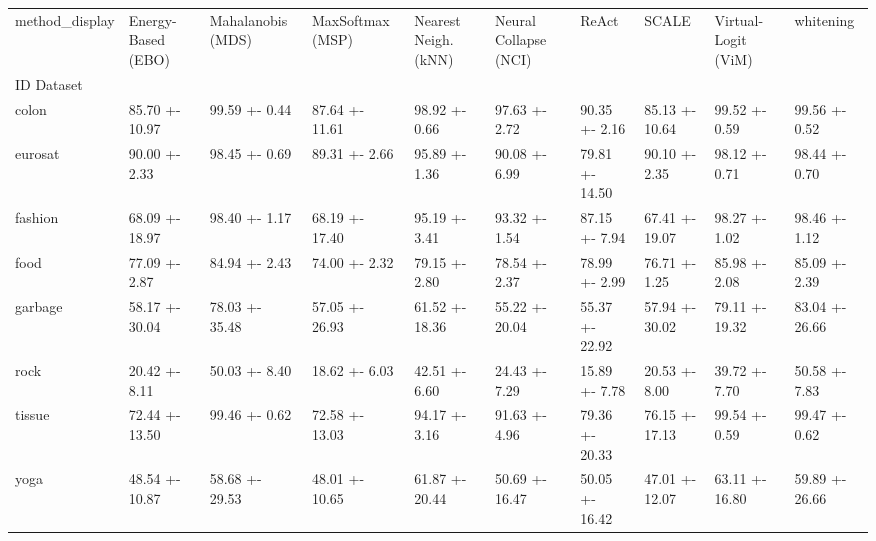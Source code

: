 \begin{tabular}{llllllllll}
\toprule
method_display & Energy-Based (EBO) & Mahalanobis (MDS) & MaxSoftmax (MSP) & Nearest Neigh. (kNN) & Neural Collapse (NCI) & ReAct & SCALE & Virtual-Logit (ViM) & whitening \\
ID Dataset &  &  &  &  &  &  &  &  &  \\
\midrule
colon & 85.70 +- 10.97 & 99.59 +- 0.44 & 87.64 +- 11.61 & 98.92 +- 0.66 & 97.63 +- 2.72 & 90.35 +- 2.16 & 85.13 +- 10.64 & 99.52 +- 0.59 & 99.56 +- 0.52 \\
eurosat & 90.00 +- 2.33 & 98.45 +- 0.69 & 89.31 +- 2.66 & 95.89 +- 1.36 & 90.08 +- 6.99 & 79.81 +- 14.50 & 90.10 +- 2.35 & 98.12 +- 0.71 & 98.44 +- 0.70 \\
fashion & 68.09 +- 18.97 & 98.40 +- 1.17 & 68.19 +- 17.40 & 95.19 +- 3.41 & 93.32 +- 1.54 & 87.15 +- 7.94 & 67.41 +- 19.07 & 98.27 +- 1.02 & 98.46 +- 1.12 \\
food & 77.09 +- 2.87 & 84.94 +- 2.43 & 74.00 +- 2.32 & 79.15 +- 2.80 & 78.54 +- 2.37 & 78.99 +- 2.99 & 76.71 +- 1.25 & 85.98 +- 2.08 & 85.09 +- 2.39 \\
garbage & 58.17 +- 30.04 & 78.03 +- 35.48 & 57.05 +- 26.93 & 61.52 +- 18.36 & 55.22 +- 20.04 & 55.37 +- 22.92 & 57.94 +- 30.02 & 79.11 +- 19.32 & 83.04 +- 26.66 \\
rock & 20.42 +- 8.11 & 50.03 +- 8.40 & 18.62 +- 6.03 & 42.51 +- 6.60 & 24.43 +- 7.29 & 15.89 +- 7.78 & 20.53 +- 8.00 & 39.72 +- 7.70 & 50.58 +- 7.83 \\
tissue & 72.44 +- 13.50 & 99.46 +- 0.62 & 72.58 +- 13.03 & 94.17 +- 3.16 & 91.63 +- 4.96 & 79.36 +- 20.33 & 76.15 +- 17.13 & 99.54 +- 0.59 & 99.47 +- 0.62 \\
yoga & 48.54 +- 10.87 & 58.68 +- 29.53 & 48.01 +- 10.65 & 61.87 +- 20.44 & 50.69 +- 16.47 & 50.05 +- 16.42 & 47.01 +- 12.07 & 63.11 +- 16.80 & 59.89 +- 26.66 \\
\bottomrule
\end{tabular}
